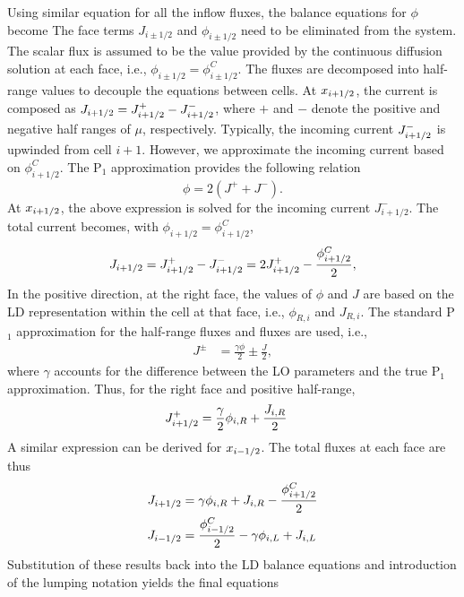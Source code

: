 Using similar equation for all the inflow fluxes, the balance equations for $\phi$
become
The face terms $J_{i\pm 1/2}$ and $\phi_{i\pm 1/2}$ need to be eliminated from the
system. The scalar flux is assumed to be the value provided by the continuous
diffusion solution at each face, i.e., $\phi_{i\pm1/2} = \phi_{i\pm1/2}^C$.
The fluxes are decomposed into half-range values to decouple the equations
between cells.  At $x_{{i+1/2}}$, the current is composed as $J_{i+1/2} = J_{{i+1/2}}^+ - J_{{i+1/2}}^-$,
where $+$ and $-$ denote the positive and negative
half ranges of $\mu$, respectively.  Typically, the incoming current $J_{{i+1/2}}^-$ is
upwinded from cell $i+1$. However, we approximate the incoming current based on $\phi_{i+1/2}^C$.  
The P$_1$ approximation provides the following relation
\begin{equation}
    \phi = 2(J^+ + J^-).
\end{equation}
At ${x_{i+1/2}}$, the above expression is solved for the incoming current $J_{i+1/2}^-$.  The
total current becomes, with $\phi_{i+1/2}=\phi_{i+1/2}^C$,
\begin{equation}\label{eq:jelim}
    J_{{i+1/2}} = J_{{i+1/2}}^+ - J_{{i+1/2}}^- = 2J_{{i+1/2}}^+ - \frac{\phi_{i+1/2}^C}{2},
\end{equation}
In the positive direction, at the right face, the
values of $\phi$ and $J$ are based on the LD representation within the cell at that
face, i.e., $\phi_{R,i}$ and $J_{R,i}$.  The standard P$_1$ approximation for the
half-range fluxes and fluxes are used\cite{stacy}, i.e.,
\begin{align}
    J^{\pm} &= \frac{\gamma \phi}{2} \pm \frac{J}{2},
\end{align}
where $\gamma$ accounts for the difference between the LO parameters and the true
P$_1$ approximation. Thus, for the right face and positive half-range,
\begin{align}
    J_{{i+1/2}}^+ &= \frac{\gamma}{2}\phi_{i,R} + \frac{J_{i,R}}{2} 
\end{align}
A similar expression can be derived for ${x_{i-1/2}}$.  The total fluxes at each face are
thus
\begin{align}
    J_{i+1/2} &= \gamma\phi_{i,R} + J_{i,R} - \frac{\phi_{{i+1/2}}^C}{2} \\
    J_{i-1/2} &= \frac{\phi_{i-1/2}^C}{2} - \gamma \phi_{i,L} + J_{i,L}
\end{align}
Substitution of these results back into the LD balance equations and introduction of the
lumping notation yields the final equations 
